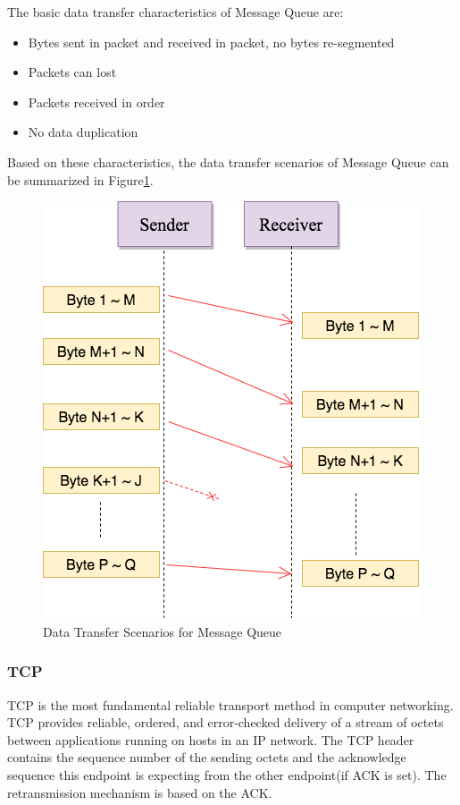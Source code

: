 The basic data transfer characteristics of Message Queue are:
\begin{itemize}
  \item Bytes sent in packet and received in packet, no bytes re-segmented
  \item Packets can lost
  \item Packets received in order
  \item No data duplication
\end{itemize}
Based on these characteristics,  the data transfer scenarios of Message Queue can be summarized in Figure\ref{msmq}.
\begin{figure}[H]
\centerline{\includegraphics[scale=0.48]{Figures/msmq}}
\caption{Data Transfer Scenarios for Message Queue}
\label{msmq}
\end{figure}

\subsubsection{TCP}
TCP is the most fundamental reliable transport method in computer networking. TCP provides reliable, ordered, and error-checked delivery of a stream of octets between applications running on hosts in an IP network. The TCP header contains the sequence number of the sending octets and the acknowledge sequence this endpoint is expecting from the other endpoint(if ACK is set). The retransmission mechanism is based on the ACK. 

